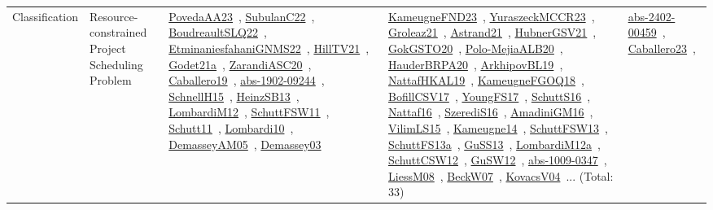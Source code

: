 {\begin{longtable}{lp{3cm}>{\raggedright\arraybackslash}p{6cm}>{\raggedright\arraybackslash}p{6cm}>{\raggedright\arraybackslash}p{8cm}}
Classification & Resource-constrained Project Scheduling Problem & \href{../works/PovedaAA23.pdf}{PovedaAA23}~\cite{PovedaAA23}, \href{../works/SubulanC22.pdf}{SubulanC22}~\cite{SubulanC22}, \href{../works/BoudreaultSLQ22.pdf}{BoudreaultSLQ22}~\cite{BoudreaultSLQ22}, \href{../works/EtminaniesfahaniGNMS22.pdf}{EtminaniesfahaniGNMS22}~\cite{EtminaniesfahaniGNMS22}, \href{../works/HillTV21.pdf}{HillTV21}~\cite{HillTV21}, \href{../works/Godet21a.pdf}{Godet21a}~\cite{Godet21a}, \href{../works/ZarandiASC20.pdf}{ZarandiASC20}~\cite{ZarandiASC20}, \href{../works/Caballero19.pdf}{Caballero19}~\cite{Caballero19}, \href{../works/abs-1902-09244.pdf}{abs-1902-09244}~\cite{abs-1902-09244}, \href{../works/SchnellH15.pdf}{SchnellH15}~\cite{SchnellH15}, \href{../works/HeinzSB13.pdf}{HeinzSB13}~\cite{HeinzSB13}, \href{../works/LombardiM12.pdf}{LombardiM12}~\cite{LombardiM12}, \href{../works/SchuttFSW11.pdf}{SchuttFSW11}~\cite{SchuttFSW11}, \href{../works/Schutt11.pdf}{Schutt11}~\cite{Schutt11}, \href{../works/Lombardi10.pdf}{Lombardi10}~\cite{Lombardi10}, \href{../works/DemasseyAM05.pdf}{DemasseyAM05}~\cite{DemasseyAM05}, \href{../works/Demassey03.pdf}{Demassey03}~\cite{Demassey03} & \href{../works/KameugneFND23.pdf}{KameugneFND23}~\cite{KameugneFND23}, \href{../works/YuraszeckMCCR23.pdf}{YuraszeckMCCR23}~\cite{YuraszeckMCCR23}, \href{../works/Groleaz21.pdf}{Groleaz21}~\cite{Groleaz21}, \href{../works/Astrand21.pdf}{Astrand21}~\cite{Astrand21}, \href{../works/HubnerGSV21.pdf}{HubnerGSV21}~\cite{HubnerGSV21}, \href{../works/GokGSTO20.pdf}{GokGSTO20}~\cite{GokGSTO20}, \href{../works/Polo-MejiaALB20.pdf}{Polo-MejiaALB20}~\cite{Polo-MejiaALB20}, \href{../works/HauderBRPA20.pdf}{HauderBRPA20}~\cite{HauderBRPA20}, \href{../works/ArkhipovBL19.pdf}{ArkhipovBL19}~\cite{ArkhipovBL19}, \href{../works/NattafHKAL19.pdf}{NattafHKAL19}~\cite{NattafHKAL19}, \href{../works/KameugneFGOQ18.pdf}{KameugneFGOQ18}~\cite{KameugneFGOQ18}, \href{../works/BofillCSV17.pdf}{BofillCSV17}~\cite{BofillCSV17}, \href{../works/YoungFS17.pdf}{YoungFS17}~\cite{YoungFS17}, \href{../works/SchuttS16.pdf}{SchuttS16}~\cite{SchuttS16}, \href{../works/Nattaf16.pdf}{Nattaf16}~\cite{Nattaf16}, \href{../works/SzerediS16.pdf}{SzerediS16}~\cite{SzerediS16}, \href{../works/AmadiniGM16.pdf}{AmadiniGM16}~\cite{AmadiniGM16}, \href{../works/VilimLS15.pdf}{VilimLS15}~\cite{VilimLS15}, \href{../works/Kameugne14.pdf}{Kameugne14}~\cite{Kameugne14}, \href{../works/SchuttFSW13.pdf}{SchuttFSW13}~\cite{SchuttFSW13}, \href{../works/SchuttFS13a.pdf}{SchuttFS13a}~\cite{SchuttFS13a}, \href{../works/GuSS13.pdf}{GuSS13}~\cite{GuSS13}, \href{../works/LombardiM12a.pdf}{LombardiM12a}~\cite{LombardiM12a}, \href{../works/SchuttCSW12.pdf}{SchuttCSW12}~\cite{SchuttCSW12}, \href{../works/GuSW12.pdf}{GuSW12}~\cite{GuSW12}, \href{../works/abs-1009-0347.pdf}{abs-1009-0347}~\cite{abs-1009-0347}, \href{../works/LiessM08.pdf}{LiessM08}~\cite{LiessM08}, \href{../works/BeckW07.pdf}{BeckW07}~\cite{BeckW07}, \href{../works/KovacsV04.pdf}{KovacsV04}~\cite{KovacsV04}... (Total: 33) & \href{../works/abs-2402-00459.pdf}{abs-2402-00459}~\cite{abs-2402-00459}, \href{../works/Caballero23.pdf}{Caballero23}~\cite{Caballero23}, 
\end{longtable}}
